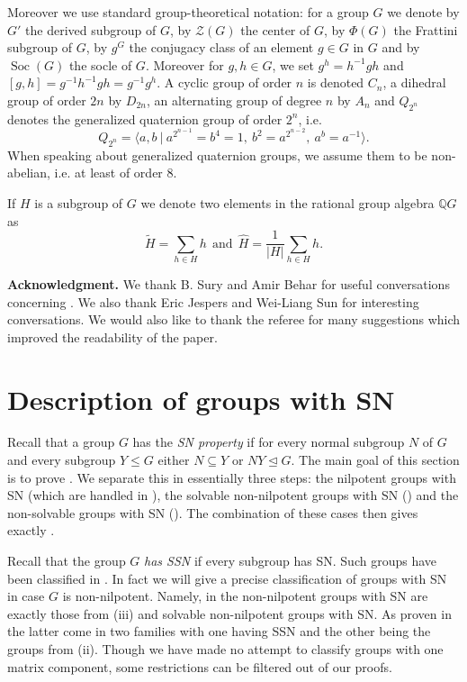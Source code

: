 \documentclass[a4paper,10pt]{amsart}
\theoremstyle{definition}
\theoremstyle{remark}
\newcommand{\ZZ}{\mathcal{Z}}
\newcommand\Soc{\operatorname{Soc}}
\begin{document}
Moreover we use standard group-theoretical notation: for a group $G$ we denote by $G'$ the derived subgroup of $G$, by $\ZZ(G)$ the center of $G$, by $\Phi(G)$ the Frattini subgroup of $G$, by $g^G$ the conjugacy class of an element $g\in G$ in $G$ and by $\Soc(G)$ the socle of $G$. Moreover for $g,h \in G$, we set $g^h = h^{-1}gh$ and $[g,h] = g^{-1}h^{-1}gh = g^{-1}g^h$. A cyclic group of order $n$ is denoted $C_n$, a dihedral group of order $2n$ by $D_{2n}$, an alternating group of degree $n$ by $A_n$ and $Q_{2^n}$ denotes the generalized quaternion group of order $2^n$, i.e. 
\[Q_{2^n} = \langle a, b \ | \ a^{2^{n-1}} = b^4 = 1, \ b^2 = a^{2^{n-2}}, \ a^b = a^{-1} \rangle. \]
When speaking about generalized quaternion groups, we assume them to be non-abelian, i.e. at least of order $8$. 

If $H$ is a subgroup of $G$ we denote two elements in the rational group algebra $\mathbb{Q}G$ as 
\[\widetilde{H} = \sum_{h \in H} h  \ \ \text{and} \ \ \widehat{H} = \frac{1}{|H|} \sum_{h \in H} h. \]

\vspace{0,2cm}
\noindent \textbf{Acknowledgment.} 
We thank B. Sury and Amir Behar for useful conversations concerning . We also thank Eric Jespers and Wei-Liang Sun for interesting conversations. We would also like to thank the referee for many suggestions which improved the readability of the paper.

\section{Description of groups with SN}\label{sec:SN}
Recall that a group $G$ has the {\it SN property} if for every normal subgroup $N$ of $G$ and every subgroup $Y \leq G$ either $N \subseteq Y$ or $N Y \unlhd G$. 
The main goal of this section is to prove . We separate this in essentially three steps: the nilpotent groups with SN (which are handled in  ), the solvable non-nilpotent groups with SN () and the non-solvable groups with SN ().  The combination of these cases then gives exactly . 

Recall that the group $G$ {\it has SSN} if every subgroup has SN. Such groups have been classified in \cite{LiuPassman16}. In fact we will give a precise classification of groups with SN in case $G$ is non-nilpotent.  Namely, in  the non-nilpotent groups with SN are exactly those from (iii) and solvable non-nilpotent groups with SN. As proven in   the latter come in two families with one having SSN and the other being the groups from (ii). Though we have made no attempt to classify groups with one matrix component, some restrictions can be filtered out of our proofs.
\end{document}

